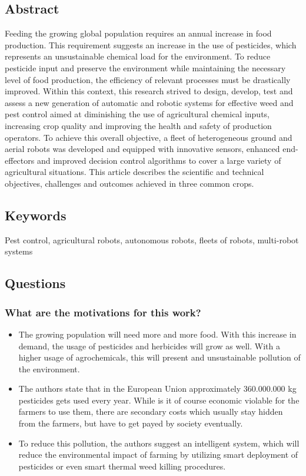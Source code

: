 \documentclass{article}
\begin{document}
\subsection*{Abstract}
Feeding the growing global population requires an annual increase in food
production. This requirement suggests an increase in the use of pesticides, which represents
an unsustainable chemical load for the environment. To reduce pesticide input and preserve the environment while maintaining the necessary level of food production, the
efficiency of relevant processes must be drastically improved. Within this context, this
research strived to design, develop, test and assess a new generation of automatic and
robotic systems for effective weed and pest control aimed at diminishing the use of
agricultural chemical inputs, increasing crop quality and improving the health and safety of
production operators. To achieve this overall objective, a fleet of heterogeneous ground
and aerial robots was developed and equipped with innovative sensors, enhanced end-effectors and improved decision control algorithms to cover a large variety of agricultural
situations. This article describes the scientific and technical objectives, challenges and
outcomes achieved in three common crops.

\subsection*{Keywords}
Pest control, agricultural robots, autonomous robots, fleets of robots, multi-robot systems


\subsection*{Questions}
\subsubsection*{What are the motivations for this work?}
\begin{itemize}
    \item The growing population will need more and more food. With this increase in demand, the usage of pesticides and herbicides will grow as well. With a higher usage of agrochemicals, this will present and unsustainable pollution of the environment.
    \item The authors state that in the European Union approximately 360.000.000 kg pesticides gets used every year. While is it of course economic violable for the farmers to use them, there are secondary costs which usually stay hidden from the farmers, but have to get payed by society eventually.
    \item To reduce this pollution, the authors suggest an intelligent system, which will reduce the environmental impact of farming by utilizing smart deployment of pesticides or even smart thermal weed killing procedures.
\end{itemize}
\end{document}
